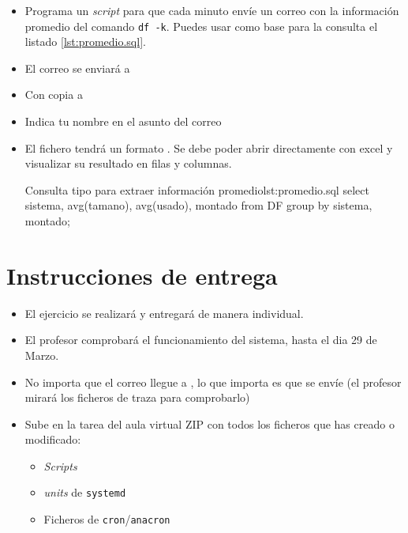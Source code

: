 \begin{homeworkProblem}

  \begin{itemize}
  \item Programa un \textit{script} para que cada minuto envíe un correo con la información promedio del comando  \texttt{df -k}. Puedes usar como base para la consulta el listado \ref{lst:promedio.sql}.
  \item El correo se enviará a  
  \item Con copia a 
  \item Indica tu nombre en el asunto del correo  
  \item El fichero tendrá un formato . Se debe poder abrir directamente con excel y visualizar su resultado en filas y columnas.


\begin{listadoshell}{Consulta tipo para extraer información promedio}{lst:promedio.sql}
  select 
    sistema, avg(tamano), avg(usado), montado
  from 
    DF
  group by
    sistema, montado;
\end{listadoshell}
    
\end{itemize}
\end{homeworkProblem}


\section{Instrucciones de entrega}
\begin{itemize}
\item El ejercicio se realizará y entregará de manera individual.
\item El profesor comprobará el funcionamiento del sistema, hasta el dia 29 de Marzo.
\item No importa que el correo llegue a , lo que importa es que se envíe (el profesor mirará los ficheros de traza para comprobarlo)
\item Sube en la tarea del aula virtual ZIP con todos los ficheros que has creado o modificado:
  \begin{itemize}
  \item \textit{Scripts}
  \item \textit{units} de \texttt{systemd}
  \item Ficheros de \texttt{cron}/\texttt{anacron}
  \end{itemize}
\end{itemize}

